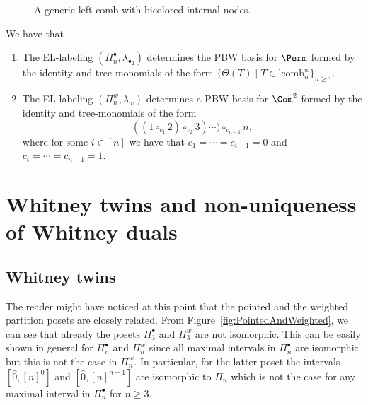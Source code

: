  \begin{figure}
     \centering
     \caption{A generic left comb with bicolored internal nodes.}
     \label{fig:left_comb}
 \end{figure}


 \begin{theo} We have that
 
 \begin{enumerate}
     \item The EL-labeling $(\Pi_n^{\bullet},\lambda_{\bullet_2})$ determines the PBW basis for $\Perm$ formed by the identity and tree-monomials of the form
  $\{\Theta(T) \mid T\in \mathrm{lcomb}_{n}^{w}\}_{n\ge 1}$.
  \item The EL-labeling $(\Pi_n^{w},\lambda_{w})$ determines a PBW basis for $\Com^2$ formed by the identity and tree-monomials of the form
  $$((1\circ_{c_1} 2)\circ_{c_2} 3)\cdots ) \circ_{c_{n-1}} n,$$
   where for some $i\in [n]$ we have that $c_1=\cdots =c_{i-1}=0$  and $c_i=\cdots =c_{n-1}=1$.
 \end{enumerate}
 \end{theo}
 

     
\section{Whitney twins and non-uniqueness of Whitney duals}\label{sec:twins}


\subsection{Whitney twins}
The reader might have noticed at this point that the pointed and the weighted partition posets are closely related.  From Figure~\ref{fig:PointedAndWeighted}, we can see that already the posets $\Pi_3^{\bullet}$ and $\Pi_3^{w}$ are not isomorphic. This can be easily shown in general for $\Pi_n^{\bullet}$ and $\Pi_n^{w}$ since all maximal intervals in $\Pi_n^{\bullet}$  are isomorphic but this is not the case in $\Pi_n^{w}$. In particular, for the latter poset the intervals $[\hat{0},[n]^0]$ and $[\hat{0},[n]^{n-1}]$ are isomorphic to $\Pi_n$ which is not the case for any maximal interval in $\Pi_n^{\bullet}$ for $n\ge 3$. 


